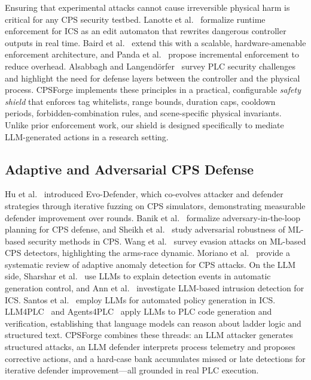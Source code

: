 Ensuring that experimental attacks cannot cause irreversible physical harm is critical for any CPS security testbed. Lanotte et al.~\cite{lanotte2022runtime_ics} formalize runtime enforcement for ICS as an edit automaton that rewrites dangerous controller outputs in real time. Baird et al.~\cite{baird2024scalable_enforcement} extend this with a scalable, hardware-amenable enforcement architecture, and Panda et al.~\cite{panda2023incremental_enforcement} propose incremental enforcement to reduce overhead. Alsabbagh and Langend{\"o}rfer~\cite{alsabbagh2023plc_security} survey PLC security challenges and highlight the need for defense layers between the controller and the physical process. CPSForge implements these principles in a practical, configurable \emph{safety shield} that enforces tag whitelists, range bounds, duration caps, cooldown periods, forbidden-combination rules, and scene-specific physical invariants. Unlike prior enforcement work, our shield is designed specifically to mediate LLM-generated actions in a research setting.

\subsection{Adaptive and Adversarial CPS Defense}

Hu et al.~\cite{hu2025evodefender} introduced Evo-Defender, which co-evolves attacker and defender strategies through iterative fuzzing on CPS simulators, demonstrating measurable defender improvement over rounds. Banik et al.~\cite{banik2023adversary_loop} formalize adversary-in-the-loop planning for CPS defense, and Sheikh et al.~\cite{sheikh2023defending_defender} study adversarial robustness of ML-based security methods in CPS. Wang et al.~\cite{wang2023evasion_survey} survey evasion attacks on ML-based CPS detectors, highlighting the arms-race dynamic. Moriano et al.~\cite{moriano2025adaptive_anomaly} provide a systematic review of adaptive anomaly detection for CPS attacks. On the LLM side, Sharshar et al.~\cite{sharshar2025explainable} use LLMs to explain detection events in automatic generation control, and Ann et al.~\cite{ann2024ids_llm} investigate LLM-based intrusion detection for ICS. Santos et al.~\cite{santos2025autopgt} employ LLMs for automated policy generation in ICS. LLM4PLC~\cite{fakih2024llm4plc} and Agents4PLC~\cite{liu2026agents4plc} apply LLMs to PLC code generation and verification, establishing that language models can reason about ladder logic and structured text. CPSForge combines these threads: an LLM attacker generates structured attacks, an LLM defender interprets process telemetry and proposes corrective actions, and a hard-case bank accumulates missed or late detections for iterative defender improvement---all grounded in real PLC execution.

